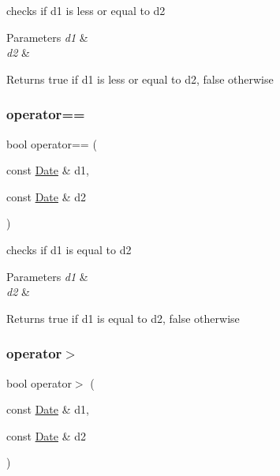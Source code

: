 checks if d1 is less or equal to d2 


\begin{DoxyParams}{Parameters}
{\em d1} & \\
\hline
{\em d2} & \\
\hline
\end{DoxyParams}
\begin{DoxyReturn}{Returns}
true if d1 is less or equal to d2, false otherwise 
\end{DoxyReturn}
\hypertarget{class_date_a18dc8aca1ca4d8cadc2b464db984135b}{}\label{class_date_a18dc8aca1ca4d8cadc2b464db984135b} 
\subsubsection{\texorpdfstring{operator==}{operator==}}
{\footnotesize\ttfamily bool operator== (\begin{DoxyParamCaption}\item[{const \hyperlink{class_date}{Date} \&}]{d1,  }\item[{const \hyperlink{class_date}{Date} \&}]{d2 }\end{DoxyParamCaption})\hspace{0.3cm}{\ttfamily [friend]}}



checks if d1 is equal to d2 


\begin{DoxyParams}{Parameters}
{\em d1} & \\
\hline
{\em d2} & \\
\hline
\end{DoxyParams}
\begin{DoxyReturn}{Returns}
true if d1 is equal to d2, false otherwise 
\end{DoxyReturn}
\hypertarget{class_date_a5c40ea6f65fef5d3e1ed8bec5e16ec41}{}\label{class_date_a5c40ea6f65fef5d3e1ed8bec5e16ec41} 
\subsubsection{\texorpdfstring{operator$>$}{operator>}}
{\footnotesize\ttfamily bool operator$>$ (\begin{DoxyParamCaption}\item[{const \hyperlink{class_date}{Date} \&}]{d1,  }\item[{const \hyperlink{class_date}{Date} \&}]{d2 }\end{DoxyParamCaption})\hspace{0.3cm}{\ttfamily [friend]}}



